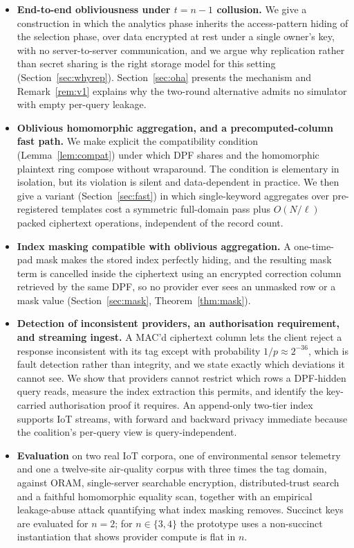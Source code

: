 \documentclass[a4paper,fleqn]{cas-dc}
\begin{document}
\begin{itemize}
\item \textbf{End-to-end obliviousness under $t=n-1$ collusion.} We give a
construction in which the analytics phase inherits the access-pattern hiding
of the selection phase, over data encrypted at rest under a single owner's
key, with no server-to-server communication, and we argue why replication
rather than secret sharing is the right storage model for this setting
(Section~\ref{sec:whyrep}). Section~\ref{sec:oha} presents the mechanism and
Remark~\ref{rem:v1} explains why the two-round alternative admits no simulator
with empty per-query leakage.

\item \textbf{Oblivious homomorphic aggregation, and a precomputed-column fast
path.} We make explicit the compatibility condition (Lemma~\ref{lem:compat})
under which DPF shares and the homomorphic plaintext ring compose without
wraparound. The condition is elementary in isolation, but its violation is
silent and data-dependent in practice. We then give a variant
(Section~\ref{sec:fast}) in which single-keyword aggregates over pre-registered
templates cost a symmetric full-domain pass plus $O(N/\ell)$ packed ciphertext
operations, independent of the record count.

\item \textbf{Index masking compatible with oblivious aggregation.} A
one-time-pad mask makes the stored index perfectly hiding, and the resulting
mask term is cancelled inside the ciphertext using an encrypted correction
column retrieved by the same DPF, so no provider ever sees an unmasked row or
a mask value (Section~\ref{sec:mask}, Theorem~\ref{thm:mask}).

\item \textbf{Detection of inconsistent providers, an authorisation
requirement, and streaming ingest.} A MAC'd ciphertext column lets the client
reject a response inconsistent with its tag except with probability
$1/p\approx2^{-36}$, which is fault detection rather than integrity, and we
state exactly which deviations it cannot see. We show that providers cannot
restrict which rows a DPF-hidden query reads, measure the index extraction
this permits, and identify the key-carried authorisation proof it requires. An
append-only two-tier index supports IoT streams, with forward and backward
privacy immediate because the coalition's per-query view is query-independent.

\item \textbf{Evaluation} on two real IoT corpora, one of environmental sensor
telemetry and one a twelve-site air-quality corpus with three times the tag
domain, against ORAM, single-server searchable encryption, distributed-trust
search and a faithful homomorphic equality scan, together with an empirical
leakage-abuse attack quantifying what index masking removes. Succinct keys are
evaluated for $n=2$; for $n\in\{3,4\}$ the prototype uses a non-succinct
instantiation that shows provider compute is flat in $n$.
\end{itemize}
\end{document}
